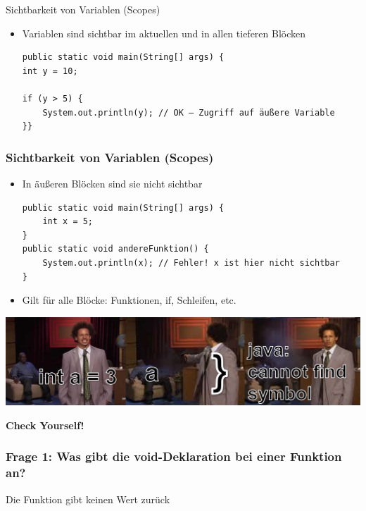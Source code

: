 \documentclass{../../presentation}
\begin{document}
\begin{frame}[fragile]{Sichtbarkeit von Variablen (Scopes)}
	\begin{itemize}
		\item\pause Variablen sind sichtbar im aktuellen und in allen tieferen Blöcken
		      \begin{verbatim}
public static void main(String[] args) {
int y = 10;

if (y > 5) {
    System.out.println(y); // OK – Zugriff auf äußere Variable
}}
    \end{verbatim}
	\end{itemize}
\end{frame}

\begin{frame}[fragile]
	\frametitle{Sichtbarkeit von Variablen (Scopes)}
	\begin{itemize}
		\item\pause In äußeren Blöcken sind sie nicht sichtbar
		      \begin{verbatim}
public static void main(String[] args) {
    int x = 5;
}
public static void andereFunktion() {
    System.out.println(x); // Fehler! x ist hier nicht sichtbar
}
    \end{verbatim}

		\item\pause Gilt für alle Blöcke: Funktionen, if, Schleifen, etc.
	\end{itemize}
	\includegraphics[width=1\linewidth]{img/scopesmemehoriz.png}
\end{frame}


\begin{frame}[plain]
	\centering
	{\Huge\bfseries{Check Yourself!}}
\end{frame}

\begin{frame}[fragile]
	\frametitle{Frage 1: Was gibt die void-Deklaration bei einer Funktion an?}
	\begin{ausgabe}
		Die Funktion gibt keinen Wert zurück
	\end{ausgabe}
\end{frame}
\end{document}
